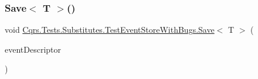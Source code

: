 \mbox{\label{classCqrs_1_1Tests_1_1Substitutes_1_1TestEventStoreWithBugs_a22ce91768f915a6f01894137dd314c42}} 
\subsubsection{\texorpdfstring{Save$<$ T $>$()}{Save< T >()}}
{\footnotesize\ttfamily void \hyperlink{classCqrs_1_1Tests_1_1Substitutes_1_1TestEventStoreWithBugs_ae2208808270f6f4b20856f04b5693f2c}{Cqrs.\+Tests.\+Substitutes.\+Test\+Event\+Store\+With\+Bugs.\+Save}$<$ T $>$ (\begin{DoxyParamCaption}\item[{\hyperlink{interfaceCqrs_1_1Events_1_1IEvent}{I\+Event}$<$ \hyperlink{interfaceCqrs_1_1Authentication_1_1ISingleSignOnToken}{I\+Single\+Sign\+On\+Token} $>$}]{event\+Descriptor }\end{DoxyParamCaption})}

